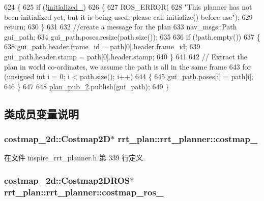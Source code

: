 \begin{DoxyCode}
624 \{
625     \textcolor{keywordflow}{if} (!\hyperlink{classrrt__plan_1_1rrt__planner_ac1cd8655573adac056ae922a92337b8d}{initialized\_})
626     \{
627         ROS\_ERROR(
628             \textcolor{stringliteral}{"This planner has not been initialized yet, but it is being used, please call initialize()
       before use"});
629         \textcolor{keywordflow}{return};
630     \}
631 
632     \textcolor{comment}{//create a message for the plan}
633     nav\_msgs::Path gui\_path;
634     gui\_path.poses.resize(path.size());
635 
636     \textcolor{keywordflow}{if} (!path.empty())
637     \{
638         gui\_path.header.frame\_id = path[0].header.frame\_id;
639         gui\_path.header.stamp = path[0].header.stamp;
640     \}
641 
642     \textcolor{comment}{// Extract the plan in world co-ordinates, we assume the path is all in the same frame}
643     \textcolor{keywordflow}{for} (\textcolor{keywordtype}{unsigned} \textcolor{keywordtype}{int} i = 0; i < path.size(); i++)
644     \{
645         gui\_path.poses[i] = path[i];
646     \}
647 
648     \hyperlink{classrrt__plan_1_1rrt__planner_a142a2d4c28bcaa2798493accf32690ee}{plan\_pub\_2}.publish(gui\_path);
649 \}
\end{DoxyCode}


\subsection{类成员变量说明}
\hypertarget{classrrt__plan_1_1rrt__planner_ad6f48786945a4a394c95de25cd4c77d2}{
\subsubsection[{costmap\-\_\-}]{\setlength{\rightskip}{0pt plus 5cm}costmap\-\_\-2d\-::\-Costmap2\-D$\ast$ rrt\-\_\-plan\-::rrt\-\_\-planner\-::costmap\-\_\-}}\label{classrrt__plan_1_1rrt__planner_ad6f48786945a4a394c95de25cd4c77d2}


在文件 inspire\-\_\-rrt\-\_\-planner.\-h 第 339 行定义.

\hypertarget{classrrt__plan_1_1rrt__planner_a3dcf8908136ace532176511eb1861528}{
\subsubsection[{costmap\-\_\-ros\-\_\-}]{\setlength{\rightskip}{0pt plus 5cm}costmap\-\_\-2d\-::\-Costmap2\-D\-R\-O\-S$\ast$ rrt\-\_\-plan\-::rrt\-\_\-planner\-::costmap\-\_\-ros\-\_\-}}\label{classrrt__plan_1_1rrt__planner_a3dcf8908136ace532176511eb1861528}


